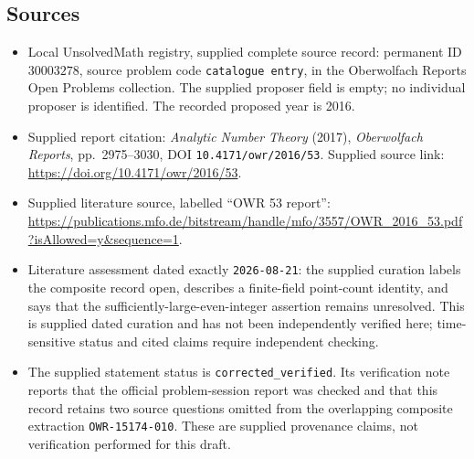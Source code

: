 \documentclass[11pt]{article}
\begin{document}
\subsection{Sources}
\begin{itemize}
\item Local UnsolvedMath registry, supplied complete source record: permanent ID \(30003278\), source problem code \texttt{catalogue entry}, in the Oberwolfach Reports Open Problems collection. The supplied proposer field is empty; no individual proposer is identified. The recorded proposed year is 2016.
\item Supplied report citation: \emph{Analytic Number Theory} (2017), \emph{Oberwolfach Reports}, pp.\ 2975--3030, DOI \texttt{10.4171/owr/2016/53}. Supplied source link: \url{https://doi.org/10.4171/owr/2016/53}.
\item Supplied literature source, labelled ``OWR 53 report'': \url{https://publications.mfo.de/bitstream/handle/mfo/3557/OWR_2016_53.pdf?isAllowed=y&sequence=1}.
\item Literature assessment dated exactly \texttt{2026-08-21}: the supplied curation labels the composite record open, describes a finite-field point-count identity, and says that the sufficiently-large-even-integer assertion remains unresolved. This is supplied dated curation and has not been independently verified here; time-sensitive status and cited claims require independent checking.
\item The supplied statement status is \texttt{corrected\_verified}. Its verification note reports that the official problem-session report was checked and that this record retains two source questions omitted from the overlapping composite extraction \texttt{OWR-15174-010}. These are supplied provenance claims, not verification performed for this draft.
\end{itemize}
\end{document}
